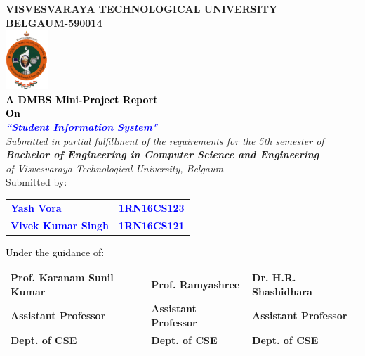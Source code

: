 
\begin{titlepage}
\begin{center}
\break\break
\textup{\large {\textcolor{darkbrown}{\bf VISVESVARAYA TECHNOLOGICAL UNIVERSITY} \\ {\textcolor{darkbrown}{\bf BELGAUM-590014}}}}\\
\includegraphics[width=0.12\textwidth]{./VTU.png}\\
\textup{\small {\textcolor{black}{\textbf {A DMBS Mini-Project Report} \\ {\textbf {On}}}}} \\
\textup{\large {\textcolor{blue}{\textbf {\textit {``Student Information System"}}}}} \\[0.2in]
\textup{{\textit {Submitted in partial fulfillment of the requirements for the 5th semester of} \\ {\textbf {\textit {Bachelor of Engineering in Computer Science and Engineering}} \\ \textit {of Visvesvaraya Technological University, Belgaum}}}}\\
\textup{Submitted by:} 
\break\break
\begin{tabular}{l  l}
\textcolor{blue}{\textbf{Yash Vora}} & \textcolor{blue}{\hspace{2.7cm}\textbf{1RN16CS123}}\\
\textcolor{blue}{\textbf{Vivek Kumar Singh}} & \textcolor{blue}{\hspace{2.7cm}\textbf{1RN16CS121}}\\
\end{tabular}
\break\break\break\break
\textup{\normalsize {\textcolor{black}{ Under the guidance of:}}}\break\break
\begin{tabular}{l  l  l}
\textbf{Prof. Karanam Sunil Kumar} & \textbf{Prof. Ramyashree} & \textbf{Dr. H.R. Shashidhara} \\
\textbf{Assistant Professor} & \textbf{Assistant Professor} & \textbf{Assistant Professor} \\
\textbf{Dept. of CSE} & \textbf{Dept. of CSE} & \textbf{Dept. of CSE}\\
\end{tabular}


\end{center}
\end{titlepage}
